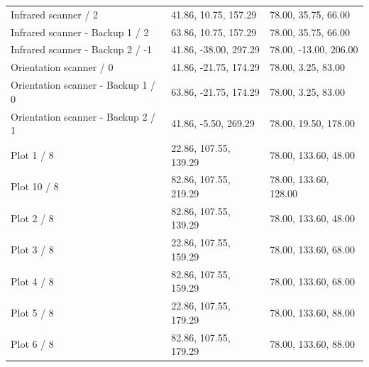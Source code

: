 \begin{longtable}{p{}p{}p{}}
Infrared scanner /\allowbreak{} 2 & 41.\allowbreak{}86, 10.\allowbreak{}75, 157.\allowbreak{}29 & 78.\allowbreak{}00, 35.\allowbreak{}75, 66.\allowbreak{}00 \\
Infrared scanner - Backup 1 /\allowbreak{} 2 & 63.\allowbreak{}86, 10.\allowbreak{}75, 157.\allowbreak{}29 & 78.\allowbreak{}00, 35.\allowbreak{}75, 66.\allowbreak{}00 \\
Infrared scanner - Backup 2 /\allowbreak{} -1 & 41.\allowbreak{}86, -38.\allowbreak{}00, 297.\allowbreak{}29 & 78.\allowbreak{}00, -13.\allowbreak{}00, 206.\allowbreak{}00 \\
Orientation scanner /\allowbreak{} 0 & 41.\allowbreak{}86, -21.\allowbreak{}75, 174.\allowbreak{}29 & 78.\allowbreak{}00, 3.\allowbreak{}25, 83.\allowbreak{}00 \\
Orientation scanner - Backup 1 /\allowbreak{} 0 & 63.\allowbreak{}86, -21.\allowbreak{}75, 174.\allowbreak{}29 & 78.\allowbreak{}00, 3.\allowbreak{}25, 83.\allowbreak{}00 \\
Orientation scanner - Backup 2 /\allowbreak{} 1 & 41.\allowbreak{}86, -5.\allowbreak{}50, 269.\allowbreak{}29 & 78.\allowbreak{}00, 19.\allowbreak{}50, 178.\allowbreak{}00 \\
Plot 1 /\allowbreak{} 8 & 22.\allowbreak{}86, 107.\allowbreak{}55, 139.\allowbreak{}29 & 78.\allowbreak{}00, 133.\allowbreak{}60, 48.\allowbreak{}00 \\
Plot 10 /\allowbreak{} 8 & 82.\allowbreak{}86, 107.\allowbreak{}55, 219.\allowbreak{}29 & 78.\allowbreak{}00, 133.\allowbreak{}60, 128.\allowbreak{}00 \\
Plot 2 /\allowbreak{} 8 & 82.\allowbreak{}86, 107.\allowbreak{}55, 139.\allowbreak{}29 & 78.\allowbreak{}00, 133.\allowbreak{}60, 48.\allowbreak{}00 \\
Plot 3 /\allowbreak{} 8 & 22.\allowbreak{}86, 107.\allowbreak{}55, 159.\allowbreak{}29 & 78.\allowbreak{}00, 133.\allowbreak{}60, 68.\allowbreak{}00 \\
Plot 4 /\allowbreak{} 8 & 82.\allowbreak{}86, 107.\allowbreak{}55, 159.\allowbreak{}29 & 78.\allowbreak{}00, 133.\allowbreak{}60, 68.\allowbreak{}00 \\
Plot 5 /\allowbreak{} 8 & 22.\allowbreak{}86, 107.\allowbreak{}55, 179.\allowbreak{}29 & 78.\allowbreak{}00, 133.\allowbreak{}60, 88.\allowbreak{}00 \\
Plot 6 /\allowbreak{} 8 & 82.\allowbreak{}86, 107.\allowbreak{}55, 179.\allowbreak{}29 & 78.\allowbreak{}00, 133.\allowbreak{}60, 88.\allowbreak{}00 \\

\end{longtable}
